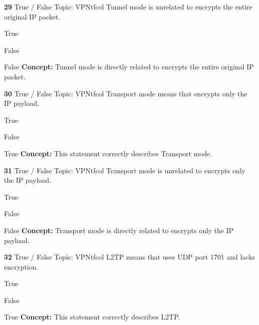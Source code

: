 \documentclass[10pt,a4paper]{article}
\begin{document}
\begin{qcard}{\color{white}\textbf{29} \hfill \small True / False \textbar{} Topic: VPN}{tfcol}
Tunnel mode is unrelated to encrypts the entire original IP packet.

\begin{qoptions}
\item True
\item False
\end{qoptions}
\begin{explainbox}{False}
\textbf{Concept:} Tunnel mode is directly related to encrypts the entire original IP packet.
\end{explainbox}
\end{qcard}

\begin{qcard}{\color{white}\textbf{30} \hfill \small True / False \textbar{} Topic: VPN}{tfcol}
Transport mode means that encrypts only the IP payload.

\begin{qoptions}
\item True
\item False
\end{qoptions}
\begin{explainbox}{True}
\textbf{Concept:} This statement correctly describes Transport mode.
\end{explainbox}
\end{qcard}

\begin{qcard}{\color{white}\textbf{31} \hfill \small True / False \textbar{} Topic: VPN}{tfcol}
Transport mode is unrelated to encrypts only the IP payload.

\begin{qoptions}
\item True
\item False
\end{qoptions}
\begin{explainbox}{False}
\textbf{Concept:} Transport mode is directly related to encrypts only the IP payload.
\end{explainbox}
\end{qcard}

\begin{qcard}{\color{white}\textbf{32} \hfill \small True / False \textbar{} Topic: VPN}{tfcol}
L2TP means that uses UDP port 1701 and lacks encryption.

\begin{qoptions}
\item True
\item False
\end{qoptions}
\begin{explainbox}{True}
\textbf{Concept:} This statement correctly describes L2TP.
\end{explainbox}
\end{qcard}
\end{document}
